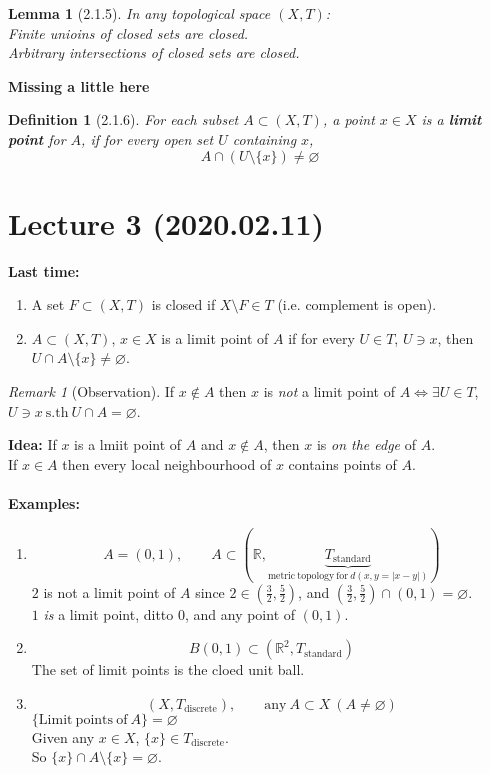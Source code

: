 \documentclass{article}
\newcommand{\sth}{\mathrm{s.th}\ }
\newcommand{\R}{\mathbb{R}}
\newcommand{\abs}[1]{\left|#1\right|}
\renewcommand{\emptyset}{\varnothing}
\newtheorem{slemma}[stheorem]{Lemma}
\newtheorem{sdefinition}[stheorem]{Definition}
\theoremstyle{remark}
\theoremstyle{example}
\theoremstyle{examples}
\newtheorem*{remark}{Remark}
\begin{document}
	\begin{slemma}[2.1.5]
		In any topological space $(X,T)$:\\
		Finite unioins of closed sets are closed.\\
		Arbitrary intersections of closed sets are closed.
	\end{slemma}

	\textbf{Missing a little here}
	
	\begin{sdefinition}[2.1.6]
		For each subset $A \subset (X,T)$, a point $x \in X$ is a \textbf{limit point} for $A$, if for every open set $U$ containing $x$, \[A \cap \left(U \setminus \{x\}\right) \neq \emptyset \]
	\end{sdefinition}
	\pagebreak

	\section*{Lecture 3 (2020.02.11)}
	\textbf{Last time:}
	\begin{enumerate}
		\item A set $F \subset (X,T)$ is closed if $X \setminus F \in T$ (i.e. complement is open).
		\item $A \subset (X,T)$, $x \in X$ is a limit point of $A$ if for every $U \in T$, $U \ni x$, then $U \cap A \setminus \{x\} \neq \emptyset$.
	\end{enumerate}
	
	\begin{remark}[Observation]
		\label{notinnotlimit}
		If $x \notin A$ then $x$ is \textit{not} a limit point of $A \iff \exists U \in T$, $U \ni x\ \sth U \cap A = \emptyset$.
	\end{remark}

	\textbf{Idea:} If $x$ is a lmiit point of $A$ and $x \notin A$, then $x$ is \textit{on the edge} of $A$.\\
	If $x \in A$ then every local neighbourhood of $x$ contains points of $A$.\\
	\\
	\textbf{Examples:}
	\begin{enumerate}
		\item \[A=(0,1),\qquad A \subset (\R,\underbrace{T_{\mathrm{standard}}}_{\mathrm{metric\ topology\ for\ } d(x,y=\abs{x-y})})\]
		$2$ is not a limit point of $A$ since $2 \in (\frac32,\frac52)$, and $(\frac32,\frac52) \cap (0,1)=\emptyset$.\\
		$1$ \textit{is} a limit point, ditto 0, and any point of $(0,1)$.
		
		\item \[B(0,1) \subset(\R^2,T_\mathrm{standard})\]
		The set of limit points is the cloed unit ball.

		\item \[(X,T_\mathrm{discrete}),\qquad \mathrm{any}\ A \subset X\ (A \neq \emptyset)\]
		$\{\mathrm{Limit\ points\ of}\ A\} = \emptyset$\\
		Given any $x \in X$, $\{x\} \in T_\mathrm{discrete}.$\\
		So $\{x\} \cap A \setminus\{x\}=\emptyset$.
	\end{enumerate}
\end{document}
